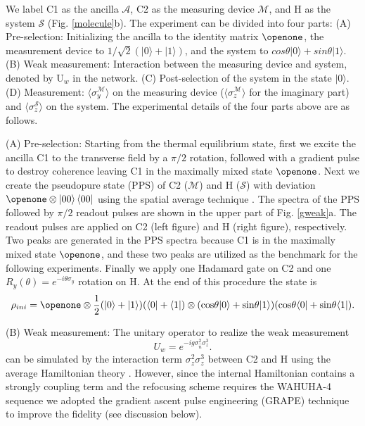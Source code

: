 \documentclass[aps,pra,12pt,onecolumn,showpacs,superscriptaddress,floatfix,footinbib,subfigure]{revtex4}
\def\bra#1{\mathinner{\langle{#1}|}}
\def\ket#1{\mathinner{|{#1}\rangle}}
\def\es{{\mathcal{S}}}
\def\md{{\mathcal{M}}}
\def\ea{{\mathcal{A}}}
\def\kb#1{\ket{#1}\bra{#1}}
\begin{document}
We label C1 as the ancilla $\ea$, C2 as the measuring device $\md$, and H as the system $\es$ (Fig. \ref{molecule}b). The experiment can be divided into four parts: (A) Pre-selection: Initializing the ancilla to the identity matrix $\openone$, the measurement device to $1/\sqrt{2}(|0\rangle+|1\rangle) $, and the system to $cos\theta|0\rangle+sin\theta|1\rangle$. (B) Weak measurement: Interaction between the measuring device and system, denoted by U$_w$ in the network. (C) Post-selection of the system in the state $|0\rangle$. (D) Measurement:  $\langle \sigma_y^\md \rangle$  on the measuring device ($\langle \sigma_z^\md \rangle$ for the imaginary part) and $\langle \sigma_z ^\es \rangle$ on the system. The experimental details of the four  parts above are as follows.

 (A) Pre-selection:  Starting from the thermal equilibrium state, first we excite the ancilla C1 to the transverse field by a $\pi/2$ rotation, followed with a gradient pulse to destroy  coherence leaving   C1 in the maximally mixed state $\openone$. Next we create the pseudopure state (PPS) of   C2 ($\md$) and  H ($\es$) with deviation $\openone \otimes \kb{00}$ using the spatial average technique \cite{spatial}. The spectra of the PPS followed by $\pi/2$ readout pulses are shown in the upper part of Fig. \ref{gweak}a. The readout pulses are applied on C2 (left figure) and H (right figure), respectively. Two peaks are generated in the PPS spectra because C1 is in the maximally mixed state $\openone$, and these two peaks are utilized as the benchmark for the following experiments. Finally  we apply one Hadamard gate on C2 and one $R_y(\theta) = e^{-i\theta\sigma_y}$ rotation on H. At the end of this procedure the state is
 \begin{eqnarray}\label{pps}
 \rho_{ini}= \openone\otimes \frac{1}{2} (|0\rangle + |1\rangle) (\langle 0 | + \langle 1 |) \otimes  (\mathrm{cos} \theta|0\rangle + \mathrm{sin}\theta|1\rangle)(\mathrm{cos}\theta\langle 0 | + \mathrm{sin}\theta\langle 1 |).
 \end{eqnarray}

 (B) Weak measurement:  The unitary operator to realize the weak measurement
 \begin{equation}\label{uw}
U_w=e^{-ig\sigma_{\hat{n}}^2 \sigma_z^3}.
 \end{equation}
 can be simulated by the interaction term $\sigma_z^2\sigma_z^3$ between C2 and H using the average Hamiltonian theory \cite{ernstbook}. However, since the internal Hamiltonian contains a strongly coupling term and the refocusing scheme requires the  WAHUHA-4 sequence \cite{wahuha} we  adopted the gradient ascent pulse engineering (GRAPE) technique \cite{grape1,grape2}  to improve the fidelity (see discussion below).
\end{document}

